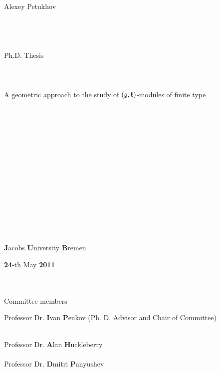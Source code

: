\documentclass[12pt]{amsart}
\theoremstyle{definition}\newtheorem{theorem}{Theorem}[section]
\theoremstyle{definition}\newtheorem{definition}[proposition]{Definition}
\theoremstyle{remark}\newtheorem{example}[proposition]{Example}
\begin{document}
\begin{titlepage}
{\Huge ~\\~\\Alexey Petukhov\\~\\~\\~\\~\\Ph.D. Thesis\\~\\~\\~\\A geometric approach to the study of $(\frak g, \frak k)$-modules of finite type}\\ \\~\\~\\~\\~\\~\\~\\~\\~\\~\\~\\~\\~\\~\\\begin{center}{\bf J}acobs {\bf U}niversity {\bf B}remen\end{center}\begin{center}{\bf24}-th May {\bf2011}\end{center}~\\~ \\Committee members\begin{center}Professor Dr. {\bf I}van {\bf P}enkov (Ph. D. Advisor and Chair of Committee)\end{center}~\\Professor Dr. {\bf A}lan {\bf H}uckleberry\hspace{10pt}~\\~\\Professor Dr. {\bf D}mitri {\bf P}anyushev~\\~\\~\\~\\~\\\end{titlepage}
\tableofcontents
\end{document}
